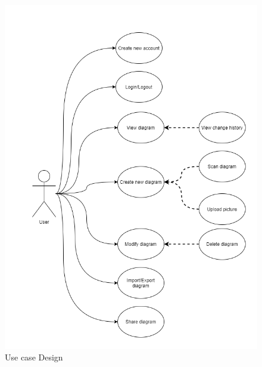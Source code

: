 \begin{figure}[!t]
\centering
\includegraphics[width=14cm]{Images/App/Usecase.png}
\caption{Use case Design}
\label{fig:usecase}
\end{figure}

